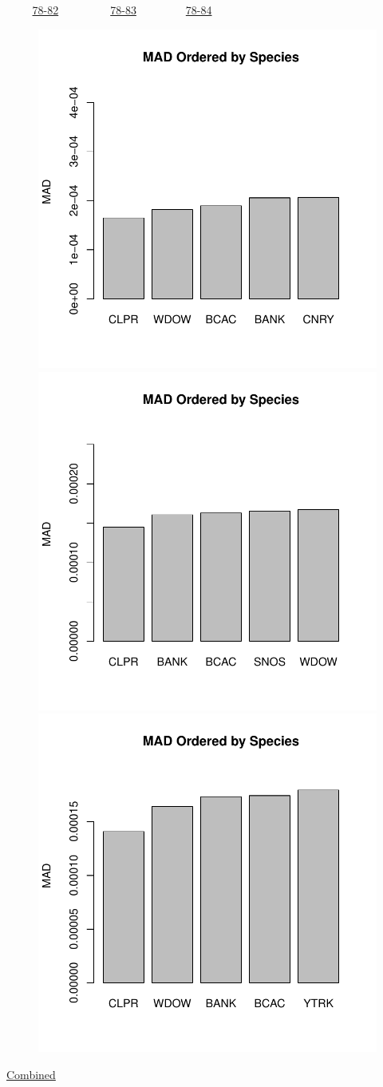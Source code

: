\documentclass[ xcolor = pdftex, dvipsnames, table ]{beamer}
\begin{document}
%
%

%
\subsection{}
\begin{frame}{$~~~~~~~~~$ \href{https://github.com/gasduster99/sppComp/tree/master/sscRuns/25319781982M4}{78-82} $~~~~~~~~~~~~~~~~~~$ \href{https://github.com/gasduster99/sppComp/tree/master/sscRuns/25319781983M4}{78-83} $~~~~~~~~~~~~~~~~~$ \href{https://github.com/gasduster99/sppComp/tree/master/sscRuns/25319781984M4}{78-84} }
        \begin{figure}[ht!]
        \centering
        \hspace*{-1cm}
        \includegraphics[width=.4\textwidth]{../sscRuns/25319781982M4/sppHeadMad68.pdf}
        \includegraphics[width=.4\textwidth]{../sscRuns/25319781983M4/sppHeadMad68.pdf}
        \includegraphics[width=.4\textwidth]{../sscRuns/25319781984M4/sppHeadMad68.pdf}
        \end{figure}
	\vspace{-1cm}
	\begin{center}
	\Large
	\href{https://github.com/gasduster99/sppComp/tree/master/try1/postSSC/25319781982345M4}{Combined}
	\end{center}
\end{frame}
\end{document}
